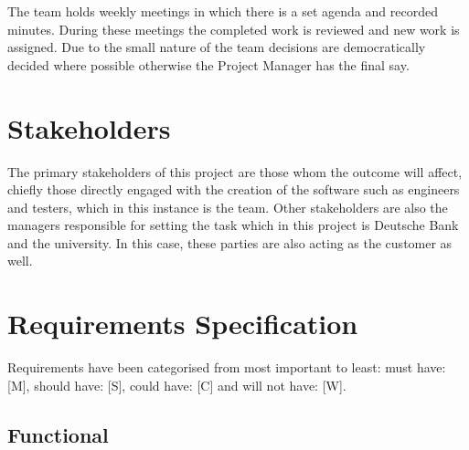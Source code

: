 \documentclass{IEEEtran}
\begin{document}
	The team holds weekly meetings in which there is a set agenda and recorded minutes. During these meetings the completed work is reviewed and new work is assigned. Due to the small nature of the team decisions are democratically decided where possible otherwise the Project Manager has the final say. 
	
	\section{Stakeholders}
	The primary stakeholders of this project are those whom the outcome will affect, chiefly those directly engaged with the creation of the software such as engineers and testers, which in this instance is the team. Other stakeholders are also the managers responsible for setting the task which in this project is Deutsche Bank and the university. In this case, these parties are also acting as the customer as well.

	\section{Requirements Specification}
	Requirements have been categorised from most important to least: must have: [M], should have: [S], could have: [C] and will not have: [W].
	\subsection{Functional}
	
	\setlength{\LTpre}{0pt}
	\setlength{\LTpost}{0pt}
	
\end{document}
